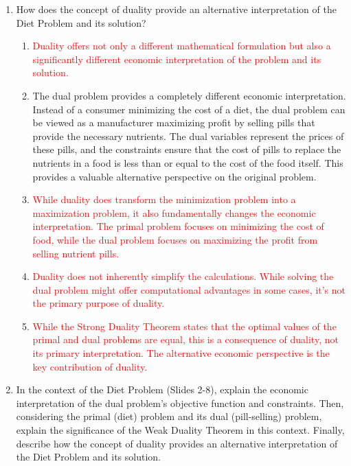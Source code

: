 \documentclass{article}%
\newcommand{\incorrect}[1]{\textcolor{red}{#1}}
\begin{document}
\begin{enumerate}
\item How does the concept of duality provide an alternative interpretation of the Diet Problem and its solution?%
\begin{enumerate}%
\item \incorrect{Duality offers not only a different mathematical formulation but also a significantly different economic interpretation of the problem and its solution.}%
\item The dual problem provides a completely different economic interpretation. Instead of a consumer minimizing the cost of a diet, the dual problem can be viewed as a manufacturer maximizing profit by selling pills that provide the necessary nutrients. The dual variables represent the prices of these pills, and the constraints ensure that the cost of pills to replace the nutrients in a food is less than or equal to the cost of the food itself. This provides a valuable alternative perspective on the original problem.%
\item \incorrect{While duality does transform the minimization problem into a maximization problem, it also fundamentally changes the economic interpretation. The primal problem focuses on minimizing the cost of food, while the dual problem focuses on maximizing the profit from selling nutrient pills.}%
\item \incorrect{Duality does not inherently simplify the calculations. While solving the dual problem might offer computational advantages in some cases, it's not the primary purpose of duality.}%
\item \incorrect{While the Strong Duality Theorem states that the optimal values of the primal and dual problems are equal, this is a consequence of duality, not its primary interpretation.  The alternative economic perspective is the key contribution of duality.}%
\end{enumerate}%
\vspace{1em}%
\item In the context of the Diet Problem (Slides 2-8), explain the economic interpretation of the dual problem's objective function and constraints.  Then, considering the primal (diet) problem and its dual (pill-selling) problem, explain the significance of the Weak Duality Theorem in this context. Finally, describe how the concept of duality provides an alternative interpretation of the Diet Problem and its solution.%
\begin{enumerate}%

\end{enumerate}
\end{enumerate}
\end{document}
